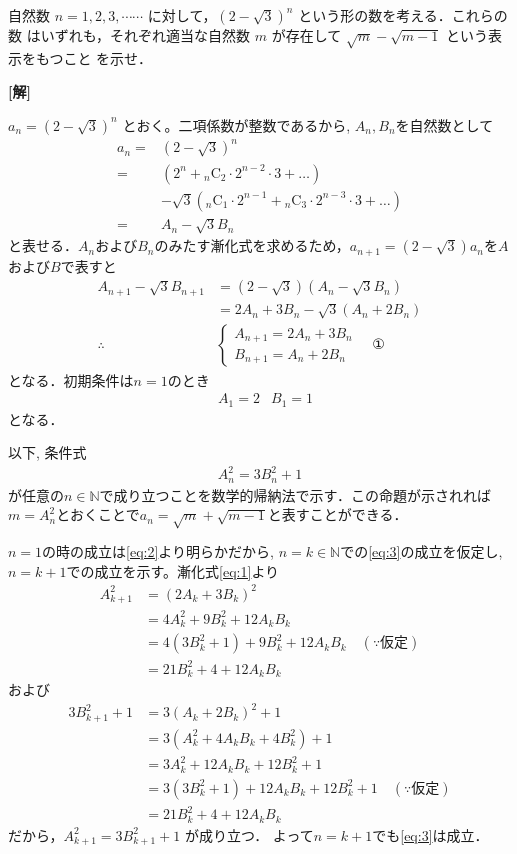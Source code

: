 \documentclass[a4paper,10pt]{ltjsarticle}
\begin{document}
\begin{oframed}
自然数 $n=1,2,3,\cdots\cdots$ に対して，$(2-\sqrt{3})^n$ という形の数を考える．これらの数
はいずれも，それぞれ適当な自然数 $m$ が存在して $\sqrt{m}-\sqrt{m-1}$ という表示をもつこと
を示せ．
\end{oframed}
\setlength{\columnseprule}{0.4pt}
\begin{multicols}{2}
{\bf[解]}

$a_n = (2-\sqrt{3})^n$ とおく。二項係数が整数であるから,
$A_n, B_n$を自然数として
\begin{align*} 
  a_n 
  =& (2-\sqrt{3})^n \\
  =& (2^n + {}_n\mathrm{C}_2 \cdot 2^{n-2} \cdot 3 + \dots) \\
   & -\sqrt{3}({}_n\mathrm{C}_1 \cdot 2^{n-1} + {}_n\mathrm{C}_3 \cdot 2^{n-3} \cdot 3 + \dots) \\ 
  =& A_n - \sqrt{3}B_n 
\end{align*}
と表せる．$A_n$および$B_n$のみたす漸化式を求めるため，$a_{n+1}=(2-\sqrt{3})a_{n}$を$A$および$B$で表すと
\begin{align*} 
  A_{n+1} - \sqrt{3}B_{n+1} 
  &= (2-\sqrt{3})(A_n - \sqrt{3}B_n) \\ 
  &= 2A_n + 3B_n - \sqrt{3}(A_n + 2B_n) \\
\therefore &
\begin{cases} 
  A_{n+1} = 2A_n+ 3B_n \\ 
  B_{n+1} = A_n + 2B_n 
\end{cases} \quad \text{①}
\end{align*}
となる．初期条件は$n=1$のとき
\begin{align}\label{eq:2}
  &A_{1} = 2 & B_{1} = 1
\end{align}
となる．

以下, 条件式
\begin{align}\label{eq:3}
A_n^2 = 3B_n^2 + 1
\end{align} 
が任意の$n \in \mathbb{N}$で成り立つことを数学的帰納法で示す．この命題が示されれば$m=A_{n}^2$とおくことで$a_{n}=\sqrt{m}+\sqrt{m-1}$と表すことができる．

$n=1$の時の成立は\cref{eq:2}より明らかだから, $n=k \in \mathbb{N}$での\cref{eq:3}の成立を仮定し, $n=k+1$での成立を示す。漸化式\cref{eq:1}より
\begin{align*} 
  A_{k+1}^2 
  &= (2A_k + 3B_k)^2 \\ 
  &= 4A_k^2 + 9B_k^2 + 12A_kB_k \\ 
  &= 4(3B_k^2 + 1) + 9B_k^2 + 12A_kB_k \quad (\text{∵仮定}) \\ 
  &= 21B_k^2 + 4 + 12A_kB_k 
\end{align*}
および
\begin{align*} 
  3B_{k+1}^2 + 1 
  &= 3(A_k + 2B_k)^2 + 1 \\ 
  &= 3(A_k^2 + 4A_kB_k + 4B_k^2) + 1 \\ 
  &= 3A_k^2 + 12A_kB_k + 12B_k^2 + 1 \\ 
  &= 3(3B_k^2 + 1) + 12A_kB_k + 12B_k^2 + 1 \quad (\text{∵仮定}) \\ 
  &= 21B_k^2 + 4 + 12A_kB_k 
\end{align*}
だから，$A_{k+1}^2 = 3B_{k+1}^2 + 1$ が成り立つ．
よって$n=k+1$でも\cref{eq:3}は成立．


\end{multicols}
\end{document}
